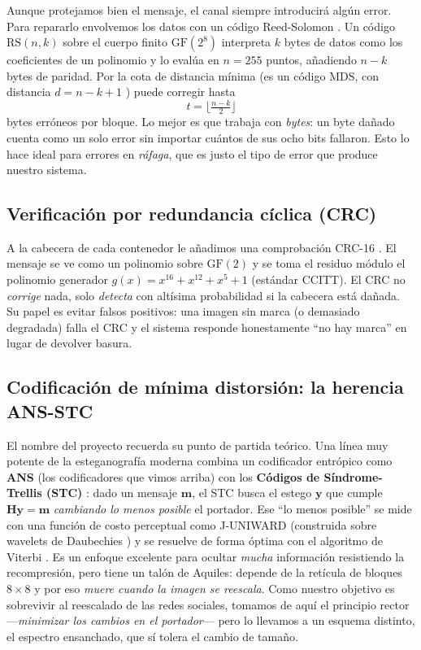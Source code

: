 \documentclass[12pt,a4paper]{article}
\renewcommand{\nobreakdash}{}
\newcommand{\vect}[1]{\mathbf{#1}}
\begin{document}
Aunque protejamos bien el mensaje, el canal siempre introducirá algún error. Para repararlo
envolvemos los datos con un código Reed\nobreakdash-Solomon \cite{reedsolomon1960}. Un
código $\mathrm{RS}(n,k)$ sobre el cuerpo finito $\mathrm{GF}(2^8)$ interpreta $k$ bytes de
datos como los coeficientes de un polinomio y lo evalúa en $n=255$ puntos, añadiendo $n-k$
bytes de paridad. Por la cota de distancia mínima (es un código MDS, con distancia
$d=n-k+1$ \cite{macwilliams1977}) puede corregir hasta
\begin{equation}
t = \Big\lfloor \tfrac{n-k}{2} \Big\rfloor
\end{equation}
bytes erróneos por bloque. Lo mejor es que trabaja con \emph{bytes}: un byte dañado cuenta
como un solo error sin importar cuántos de sus ocho bits fallaron. Esto lo hace ideal para
errores en \emph{ráfaga}, que es justo el tipo de error que produce nuestro sistema.

\subsection{Verificación por redundancia cíclica (CRC)}

A la cabecera de cada contenedor le añadimos una comprobación CRC\nobreakdash-16
\cite{peterson1961}. El mensaje se ve como un polinomio sobre $\mathrm{GF}(2)$ y se toma el
residuo módulo el polinomio generador $g(x)=x^{16}+x^{12}+x^{5}+1$ (estándar CCITT). El CRC
no \emph{corrige} nada, solo \emph{detecta} con altísima probabilidad si la cabecera está
dañada. Su papel es evitar falsos positivos: una imagen sin marca (o demasiado degradada)
falla el CRC y el sistema responde honestamente ``no hay marca'' en lugar de devolver
basura.

\subsection{Codificación de mínima distorsión: la herencia ANS-STC}

El nombre del proyecto recuerda su punto de partida teórico. Una línea muy potente de la
esteganografía moderna combina un codificador entrópico como \textbf{ANS} (los codificadores
que vimos arriba) con los \textbf{Códigos de Síndrome-Trellis (STC)} \cite{filler2011}: dado
un mensaje $\vect{m}$, el STC busca el estego $\vect{y}$ que cumple
$\vect{H}\vect{y}=\vect{m}$ \emph{cambiando lo menos posible} el portador. Ese ``lo menos
posible'' se mide con una función de costo perceptual como J-UNIWARD \cite{holub2014uniward}
(construida sobre wavelets de Daubechies \cite{daubechies1992}) y se resuelve de forma óptima
con el algoritmo de Viterbi \cite{viterbi1967}. Es un enfoque excelente para ocultar
\emph{mucha} información resistiendo la recompresión, pero tiene un talón de Aquiles: depende
de la retícula de bloques $8\times8$ y por eso \emph{muere cuando la imagen se reescala}. Como
nuestro objetivo es sobrevivir al reescalado de las redes sociales, tomamos de aquí el
principio rector ---\emph{minimizar los cambios en el portador}--- pero lo llevamos a un
esquema distinto, el espectro ensanchado, que sí tolera el cambio de tamaño.
\end{document}
